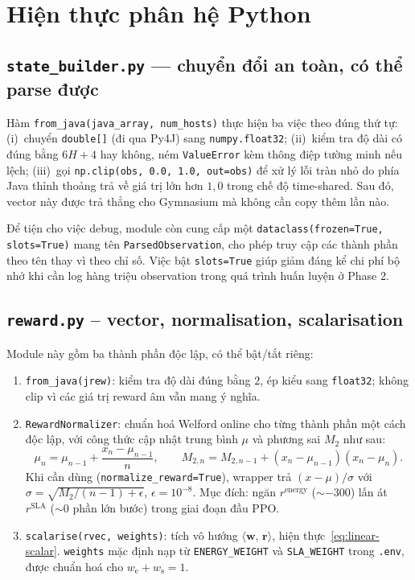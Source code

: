 \section{Hiện thực phân hệ Python}
\label{sec:impl-python}

\subsection{\texttt{state\_builder.py} --- chuyển đổi an toàn, có thể parse được}
\label{ssec:impl-state}

Hàm \texttt{from\_java(java\_array, num\_hosts)} thực hiện ba việc
theo đúng thứ tự: (i)~chuyển \texttt{double[]} (đi qua Py4J) sang
\texttt{numpy.float32}; (ii)~kiểm tra độ dài có đúng bằng $6H + 4$
hay không, ném \texttt{ValueError} kèm thông điệp tường minh nếu lệch;
(iii)~gọi \texttt{np.clip(obs, 0.0, 1.0, out=obs)} để xử lý lỗi tràn
nhỏ do phía Java thỉnh thoảng trả về giá trị lớn hơn $1{,}0$ trong chế
độ time-shared. Sau đó, vector này được trả thẳng cho Gymnasium mà
không cần copy thêm lần nào.

Để tiện cho việc debug, module còn cung cấp một
\texttt{dataclass(frozen=True, slots=True)} mang tên
\texttt{ParsedObservation}, cho phép truy cập các thành phần theo tên
thay vì theo chỉ số. Việc bật \texttt{slots=True} giúp giảm đáng kể
chi phí bộ nhớ khi cần log hàng triệu observation trong quá trình
huấn luyện ở Phase 2.

\subsection{\texttt{reward.py} -- vector, normalisation, scalarisation}
\label{ssec:impl-reward}

Module này gồm ba thành phần độc lập, có thể bật/tắt riêng:
\begin{enumerate}
  \item \texttt{from\_java(jrew)}: kiểm tra độ dài đúng bằng $2$,
        ép kiểu sang \texttt{float32}; không clip vì các giá trị
        reward âm vẫn mang ý nghĩa.
  \item \texttt{RewardNormalizer}: chuẩn hoá Welford online cho từng
        thành phần một cách độc lập, với công thức cập nhật trung
        bình $\mu$ và phương sai $M_2$ như sau:
        \[
          \mu_n = \mu_{n-1} + \frac{x_n - \mu_{n-1}}{n}, \qquad
          M_{2,n} = M_{2,n-1} + (x_n - \mu_{n-1})(x_n - \mu_n).
        \]
        Khi cần dùng (\texttt{normalize\_reward=True}), wrapper trả
        $(x - \mu)/\sigma$ với $\sigma = \sqrt{M_2 / (n-1) + \epsilon}$,
        $\epsilon = 10^{-8}$. Mục đích: ngăn $r^{\mathrm{energy}}$
        ($\sim -300$) lấn át $r^{\mathrm{SLA}}$ ($\sim 0$ phần lớn bước)
        trong giai đoạn đầu PPO.
  \item \texttt{scalarise(rvec, weights)}: tích vô hướng
        $\langle \mathbf{w},\,\mathbf{r}\rangle$, hiện thực~\eqref{eq:linear-scalar}.
        \texttt{weights} mặc định nạp từ \texttt{ENERGY\_WEIGHT} và
        \texttt{SLA\_WEIGHT} trong \texttt{.env}, được chuẩn hoá cho
        $w_{\mathrm{e}} + w_{\mathrm{s}} = 1$.
\end{enumerate}

